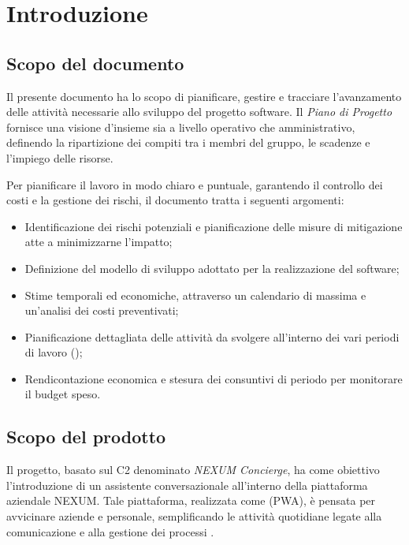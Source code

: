 \documentclass[documento]{gpt}
\begin{document}
\section{Introduzione}

\subsection{Scopo del documento}
Il presente documento ha lo scopo di pianificare, gestire e tracciare l'avanzamento delle attività necessarie allo sviluppo del progetto software. Il \textit{Piano di Progetto} fornisce una visione d'insieme sia a livello operativo che amministrativo, definendo la ripartizione dei compiti tra i membri del gruppo, le scadenze e l'impiego delle risorse.

Per pianificare il lavoro in modo chiaro e puntuale, garantendo il controllo dei costi e la gestione dei rischi, il documento tratta i seguenti argomenti:
\begin{itemize}
\item Identificazione dei rischi potenziali e pianificazione delle misure di mitigazione atte a minimizzarne l'impatto;
\item Definizione del modello di sviluppo adottato per la realizzazione del software;
\item Stime temporali ed economiche, attraverso un calendario di massima e un'analisi dei costi preventivati;
\item Pianificazione dettagliata delle attività da svolgere all'interno dei vari periodi di lavoro ();
\item Rendicontazione economica e stesura dei consuntivi di periodo per monitorare il budget speso.
\end{itemize}

\subsection{Scopo del prodotto}
Il progetto, basato sul  C2 denominato \textit{NEXUM Concierge}, ha come obiettivo l'introduzione di un assistente conversazionale all'interno della piattaforma aziendale NEXUM. Tale piattaforma, realizzata come  (PWA), è pensata per avvicinare aziende e personale, semplificando le attività quotidiane legate alla comunicazione e alla gestione dei processi .
\end{document}
